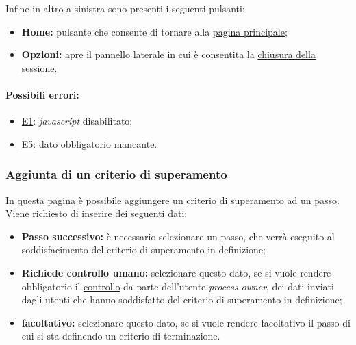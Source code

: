 Infine in altro a sinistra sono presenti i seguenti pulsanti:
\begin{itemize}
\item \textbf{Home:} pulsante che consente di tornare alla \hyperref[home]{pagina principale};
\item \textbf{Opzioni:} apre il pannello laterale in cui è consentita la \hyperref[logout]{chiusura della sessione}.
\end{itemize}

\paragraph*{Possibili errori:}
\begin{itemize}
\item \hyperref[e1]{E1}: \textit{javascript} disabilitato;
\item \hyperref[e5]{E5}: dato obbligatorio mancante.
\end{itemize}

\subsubsection{Aggiunta di un criterio di superamento}
\label{vincoli}

In questa pagina è possibile aggiungere un criterio di superamento ad un passo.
Viene richiesto di inserire dei seguenti dati:
\begin{itemize}
\item \textbf{Passo successivo:} è necessario selezionare un passo, che verrà eseguito al soddisfacimento del criterio di superamento in definizione;
\item \textbf{Richiede controllo umano:} selezionare questo dato, se si vuole rendere obbligatorio il \hyperref[controllo]{controllo} da parte dell'utente \textit{process owner}, dei dati inviati dagli utenti che hanno soddisfatto del criterio di superamento in definizione;
\item \textbf{facoltativo:} selezionare questo dato, se si vuole rendere facoltativo il passo di cui si sta definendo un criterio di terminazione.
\end{itemize}

